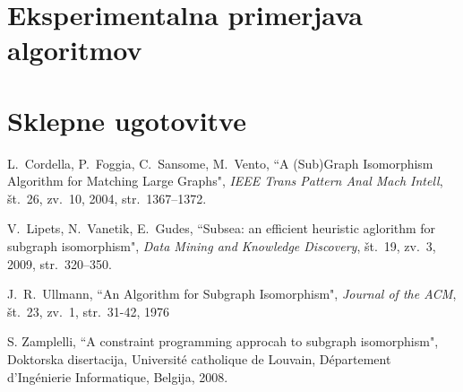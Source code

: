 \documentclass[a4paper, 12pt, ]{book}
\begin{document}
\chapter{Eksperimentalna primerjava algoritmov}
	\section{}

\chapter{Sklepne ugotovitve}


\begin{thebibliography}{99}


	 L.~Cordella, P.~Foggia, C.~Sansome, M.~Vento, ``A (Sub)Graph Isomorphism Algorithm for Matching Large Graphs",
		\textit {IEEE Trans Pattern Anal Mach Intell}, št.~26, zv.~10, 2004, str.~1367--1372.
	
	 V.~Lipets, N.~Vanetik, E.~Gudes, ``Subsea: an efficient heuristic aglorithm for subgraph isomorphism",
		\textit {Data Mining and Knowledge Discovery}, št.~19, zv.~3, 2009, str.~320--350.

	 J.~R.~Ullmann, ``An Algorithm for Subgraph Isomorphism",
		\textit{Journal of the ACM}, št.~23, zv.~1, str.~31-42, 1976

	 S. Zamplelli, ``A constraint programming approcah to subgraph isomorphism", Doktorska disertacija, 
	Universit\'{e} catholique de Louvain, D\'{e}partement d’Ing\'{e}nierie Informatique, Belgija, 2008.

\end{thebibliography}
\end{document}

